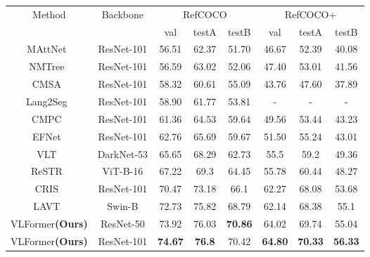 

 
\begin{table*}[ht]
\centering
\begin{tabular}{c|c|ccc|ccc}
\toprule

\multirow{2}{*}{Method} & \multirow{2}{*}{Backbone} & \multicolumn{3}{c|}{RefCOCO} & \multicolumn{3}{c}{RefCOCO+} \\ \cline{3-8} 
                        &                           & val      & testA   & testB   & val      & testA    & testB      \\ \midrule
MAttNet~\cite{yu_mattnet_2018}                    & ResNet-101                & 56.51    & 62.37   & 51.70   & 46.67    & 52.39    & 40.08          \\
NMTree~\cite{liu_learning_2019}                    & ResNet-101                & 56.59    & 63.02   & 52.06   & 47.40    & 53.01    & 41.56          \\
CMSA~\cite{ye_cross-modal_2019}                    & ResNet-101                & 58.32    & 60.61   & 55.09   & 43.76    & 47.60    & 37.89           \\
Lang2Seg~\cite{chen_referring_2019}                    & ResNet-101                & 58.90    & 61.77   & 53.81   & -    & -    & -            \\
CMPC~\cite{huang_referring_2020} & ResNet-101                & 61.36    & 64.53   & 59.64   & 49.56    & 53.44    & 43.23          \\
EFNet~\cite{feng_encoder_2021}                    & ResNet-101                & 62.76    & 65.69   & 59.67   & 51.50    & 55.24    & 43.01         \\
VLT~\cite{ding_vision-language_2021}                     & DarkNet-53                & 65.65    & 68.29   & 62.73   & 55.5     & 59.2     & 49.36     \\
ReSTR~\cite{kim_restr_2022}                   & ViT-B-16                  & 67.22    & 69.3    & 64.45   & 55.78    & 60.44    & 48.27       \\
CRIS~\cite{wang_cris_2022}                    & ResNet-101                & 70.47    & 73.18   & 66.1    & 62.27    & 68.08    & 53.68    \\
LAVT~\cite{yang_lavt_2022}                    & Swin-B                    & 72.73    & 75.82   & 68.79   & 62.14    & 68.38    & 55.1        \\ \midrule
VLFormer\textbf{(Ours)}                    & ResNet-50                    & 73.92    & 76.03   & \textbf{70.86}   & 64.02    & 69.74    & 55.04        \\ 
VLFormer\textbf{(Ours)}                     & ResNet-101                & \textbf{74.67}    & \textbf{76.8}    & 70.42   & \textbf{64.80}    & \textbf{70.33}    & \textbf{56.33}       \\
\bottomrule
\end{tabular}



\end{table*}
